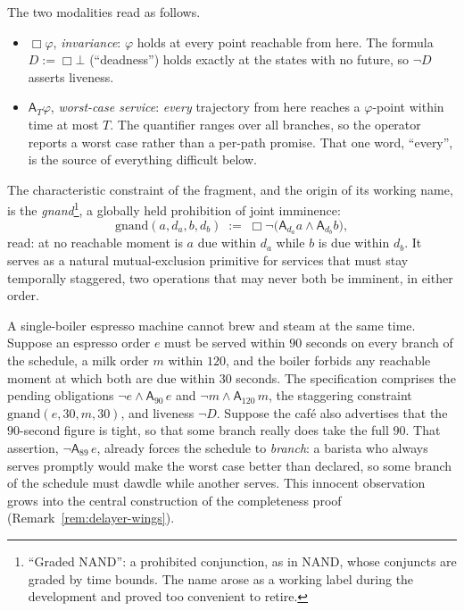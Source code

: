 The two modalities read as follows.
\begin{itemize}
\item $\Box\varphi$, \emph{invariance}: $\varphi$ holds at every
  point reachable from here. The formula $D := \Box\bot$
  (``deadness'') holds exactly at the states with no future, so
  $\neg D$ asserts liveness.
\item $\mathsf{A}_T\varphi$, \emph{worst-case service}: \emph{every}
  trajectory from here reaches a $\varphi$-point within time at most
  $T$. The quantifier ranges over all branches, so the operator
  reports a worst case rather than a per-path promise. That one word,
  ``every'', is the source of everything difficult below.
\end{itemize}

The characteristic constraint of the fragment, and the origin of its
working name, is the \emph{gnand}\footnote{``Graded NAND'': a
prohibited conjunction, as in NAND, whose conjuncts are graded by
time bounds. The name arose as a working label during the
development and proved too convenient to retire.}, a globally held
prohibition of joint imminence:
\[
\mathrm{gnand}(a, d_a, b, d_b) \;:=\;
\Box\neg\big(\mathsf{A}_{d_a}a \wedge \mathsf{A}_{d_b}b\big),
\]
read: at no reachable moment is $a$ due within $d_a$ while $b$ is due
within $d_b$. It serves as a natural mutual-exclusion primitive for
services that must stay temporally staggered, two operations that may
never both be imminent, in either order.

\begin{example}
\label{ex:espresso}
A single-boiler espresso machine cannot brew and steam at the same
time. Suppose an espresso order $e$ must be served within $90$
seconds on every branch of the schedule, a milk order $m$ within
$120$, and the boiler forbids any reachable moment at which both are
due within $30$ seconds. The specification comprises the pending
obligations $\neg e \wedge \mathsf{A}_{90}\,e$ and $\neg m \wedge
\mathsf{A}_{120}\,m$, the staggering constraint
$\mathrm{gnand}(e, 30, m, 30)$, and liveness $\neg D$. Suppose the
caf\'e also advertises that the $90$-second figure is tight, so that
some branch really does take the full $90$. That assertion,
$\neg\mathsf{A}_{89}\,e$, already forces the schedule to
\emph{branch}: a barista who always serves promptly would make the
worst case better than declared, so some branch of the schedule must
dawdle while another serves. This innocent observation grows into
the central construction of the completeness proof
(Remark~\ref{rem:delayer-wings}).
\end{example}

